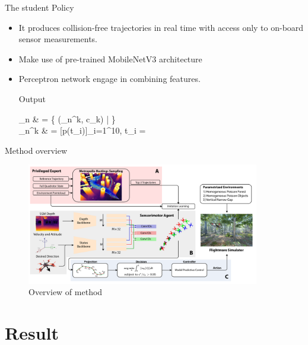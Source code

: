 \documentclass{beamer}
\begin{document}
\begin{frame}{The student Policy}
	\begin{itemize}
		\item It produces collision-free trajectories in real time with access only to on-board sensor measurements.
		\item Make use of pre-trained MobileNetV3 architecture \autocite{MobileNet}
		\item Perceptron network engage in combining features.
		\begin{block}{Output}
			\begin{flalign}
				_n & = \{ (\tau_n^k, c_k) | \in [0, 1, ..., M-1 ]\} \\
				\tau_n^k & = [p(t_i)]_{i=1}^{10}, t_i = 
			\end{flalign}
		\end{block}
		
	\end{itemize}
	
\end{frame}

\begin{frame}{Method overview}
	\begin{figure}
		\includegraphics[width=4in]{images/method-overview.png}
		\caption{Overview of method}
	\end{figure}
\end{frame}

\section{Result}
\end{document}

